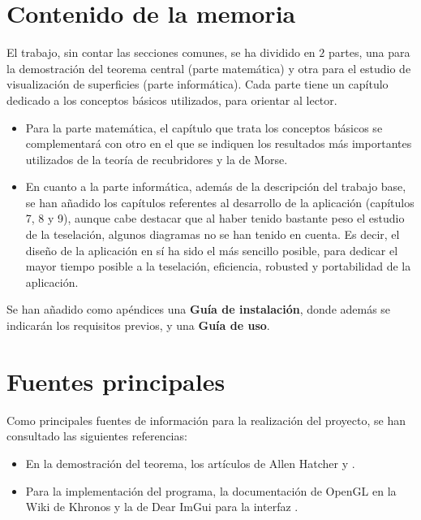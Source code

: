 \section*{Contenido de la memoria}
El trabajo, sin contar las secciones comunes, se ha dividido en $2$ partes, una para la demostración del teorema central (parte matemática) y otra para el estudio de visualización de superficies (parte informática). Cada parte tiene un capítulo dedicado a los conceptos básicos utilizados, para orientar al lector.
\begin{itemize}
	\item Para la parte matemática, el capítulo que trata los conceptos básicos se complementará con otro en el que se indiquen los resultados más importantes utilizados de la teoría de recubridores y la de Morse.
	\item En cuanto a la parte informática, además de la descripción del trabajo base, se han añadido los capítulos referentes al desarrollo de la aplicación (capítulos 7, 8 y 9), aunque cabe destacar que al haber tenido bastante peso el estudio de la teselación, algunos diagramas no se han tenido en cuenta. Es decir, el diseño de la aplicación en sí ha sido el más sencillo posible, para dedicar el mayor tiempo posible a la teselación, eficiencia, robusted y portabilidad de la aplicación.
\end{itemize}
Se han añadido como apéndices una \textbf{Guía de instalación}, donde además se indicarán los requisitos previos, y una \textbf{Guía de uso}.

\section*{Fuentes principales}
Como principales fuentes de información para la realización del proyecto, se han consultado las siguientes referencias:
\begin{itemize}
	\item En la demostración del teorema, los artículos de Allen Hatcher \cite{arXiv:1312.3518} y \cite{MorseTh1}.
	\item Para la implementación del programa, la documentación de OpenGL en la Wiki de Khronos \cite{KhronosWiki} y la de Dear ImGui para la interfaz \cite{DearImGui}.
\end{itemize}

\endinput
